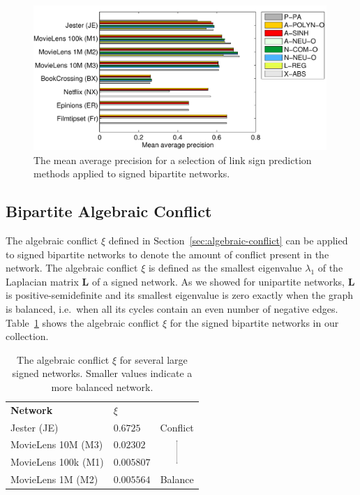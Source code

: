 \documentclass[11pt,a4paper]{book}
\newcommand{\wFull}{0.99}
\begin{document}
\begin{figure}[h!]
  \centering
  \includegraphics[width=\wFull\textwidth]{img-eps/resultsbar-bipsign}
  \caption{
    The mean average precision for a selection of link sign prediction
    methods applied to signed bipartite networks.
  }
  \label{fig:results-bipsigned}
\end{figure}

\subsection{Bipartite Algebraic Conflict}
The algebraic conflict $\xi$ defined in
Section~\ref{sec:algebraic-conflict} can be 
applied to signed bipartite networks to denote the amount of conflict
present in the network.  The algebraic conflict $\xi$ is defined as the
smallest eigenvalue $\lambda_1$ of the Laplacian matrix $\mathbf L$ of a
signed network.  As we showed for unipartite networks, $\mathbf L$ is
positive-semidefinite and its smallest eigenvalue is zero exactly when
the graph is balanced, i.e.\ when all its cycles contain an even number
of negative edges. 
Table~\ref{tab:smallest-bip} shows the algebraic conflict $\xi$ for the
signed bipartite networks in our collection. 

\begin{table}[h!]
  \centering
  \caption{
    The algebraic conflict $\xi$ for several large signed
    networks.  Smaller values indicate a more balanced network.
  }
  \begin{tabular}{ l l c }
    \cmidrule{1-2}
    \textbf{Network} &  $\xi$ \\
    \cmidrule{1-2}
    Jester (\textsf{JE}) & $0.6725\phantom{00}$ & Conflict \\
    MovieLens 10M (\textsf{M3}) &  $0.02302\phantom{0}$ 
    & \multirow{2}{*}{\includegraphics[width=5.0pt,height=25pt]{img-eps/varrow}} \\
    MovieLens 100k (\textsf{M1}) & $0.005807$ \\
    MovieLens 1M (\textsf{M2}) & $0.005564$ & Balance \\
    \cmidrule{1-2}
  \end{tabular}
  \label{tab:smallest-bip}
\end{table}
\end{document}
